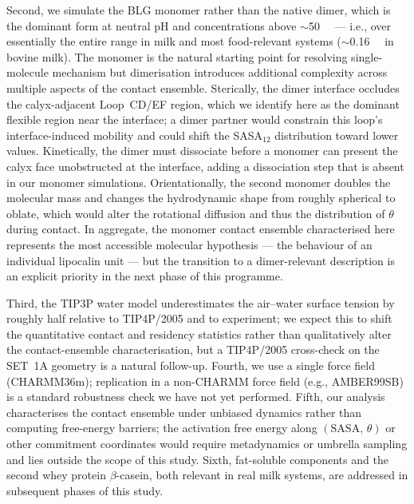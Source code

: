 \documentclass[11pt,a4paper]{article}
\begin{document}
Second, we simulate the BLG monomer rather than the native dimer, which
is the dominant form at neutral pH and concentrations above
$\sim$\SI{50}{\micro\Molar}\citep{Mercadante2012} --- i.e., over
essentially the entire range in milk and most food-relevant systems
($\sim$\SI{0.16}{\milli\Molar} in bovine milk). The monomer is the
natural starting point for resolving single-molecule mechanism but
dimerisation introduces additional complexity across multiple aspects of
the contact ensemble. Sterically, the dimer interface occludes the
calyx-adjacent Loop~CD/EF region, which we identify here as the dominant
flexible region near the interface; a dimer partner would constrain this
loop's interface-induced mobility and could shift the SASA$_{12}$
distribution toward lower values. Kinetically, the dimer must dissociate
before a monomer can present the calyx face unobstructed at the interface,
adding a dissociation step that is absent in our monomer simulations.
Orientationally, the second monomer doubles the molecular mass and
changes the hydrodynamic shape from roughly spherical to oblate, which
would alter the rotational diffusion and thus the distribution of $\theta$
during contact. In aggregate, the monomer contact ensemble characterised
here represents the most accessible molecular hypothesis --- the behaviour
of an individual lipocalin unit --- but the transition to a dimer-relevant
description is an explicit priority in the next phase of this programme.

Third, the TIP3P water model underestimates the air--water surface
tension by roughly half relative to TIP4P/2005 and to
experiment\citep{Vega2007}; we expect this to shift the quantitative
contact and residency statistics rather than qualitatively alter the
contact-ensemble characterisation, but a TIP4P/2005 cross-check on the
SET~1A geometry is a natural follow-up. Fourth, we use a single force
field (CHARMM36m); replication in a non-CHARMM force field (e.g.,
AMBER99SB) is a standard robustness check we have not yet performed.
Fifth, our analysis characterises the contact ensemble under unbiased
dynamics rather than computing free-energy barriers; the activation
free energy along $(\mathrm{SASA},\,\theta)$ or other commitment
coordinates would require metadynamics\citep{Laio2002} or umbrella
sampling and lies outside the scope of this study. Sixth, fat-soluble components and the
second whey protein $\beta$-casein, both relevant in real milk systems,
are addressed in subsequent phases of this study.

\end{document}
